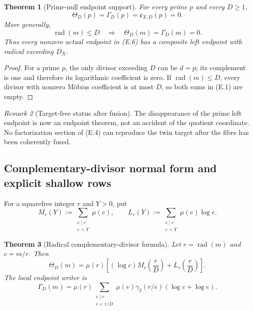 \documentclass[11pt]{article}
\newtheorem{theorem}{Theorem}[section]
\theoremstyle{definition}
\theoremstyle{remark}
\newtheorem{remark}[theorem]{Remark}
\newcommand{\rad}{\operatorname{rad}}
\begin{document}
\begin{theorem}[Prime-null endpoint support]
\label{thm:affend-prime-null}
For every prime $p$ and every $D\ge1$,
\begin{equation}
 \label{eq:affend-prime-null}
 \boxed{
 \Theta_D(p)=\Gamma_D(p)=\mathfrak e_{X,D}(p)=0.}
 \tag{E.7}
\end{equation}
More generally,
\begin{equation}
 \label{eq:affend-rad-support}
 \boxed{
 \rad(m)\le D
 \quad\Longrightarrow\quad
 \Theta_D(m)=\Gamma_D(m)=0.}
 \tag{E.8}
\end{equation}
Thus every nonzero actual endpoint in \textup{(E.6)} has a composite left
endpoint with radical exceeding $D_X$.
\end{theorem}

\begin{proof}
For a prime $p$, the only divisor exceeding $D$ can be $d=p$; its complement
is one and therefore its logarithmic coefficient is zero.  If
$\rad(m)\le D$, every divisor with nonzero M\"obius coefficient is at most
$D$, so both sums in \textup{(E.1)} are empty.
\end{proof}

\begin{remark}[Target-free status after fusion]
The disappearance of the prime left endpoint is now an endpoint theorem, not
an accident of the quotient coordinate.  No factorization section of
\textup{(E.4)} can reproduce the twin target after the fibre has been
coherently fused.
\end{remark}

\subsection{Complementary-divisor normal form and explicit shallow rows}
\label{subsec:affend-complementary-normal-form}

For a squarefree integer $r$ and $Y>0$, put
\[
 M_r(Y):=\sum_{\substack{e\mid r\\e<Y}}\mu(e),
 \qquad
 L_r(Y):=\sum_{\substack{e\mid r\\e<Y}}\mu(e)\log e.
\]

\begin{theorem}[Radical complementary-divisor formula]
\label{thm:affend-radical-formula}
Let $r=\rad(m)$ and $c=m/r$.  Then
\begin{equation}
 \label{eq:affend-radical-theta}
 \boxed{
 \Theta_D(m)
 =\mu(r)
 \left[
  (\log c)M_r\!\left(\frac rD\right)
  +L_r\!\left(\frac rD\right)
 \right].}
 \tag{E.9}
\end{equation}
The local endpoint writer is
\begin{equation}
 \label{eq:affend-radical-gamma}
 \boxed{
 \Gamma_D(m)
 =\mu(r)
 \sum_{\substack{e\mid r\\e<r/D}}
 \mu(e)\gamma_2(r/e)
 \left(\log c+\log e\right).}
 \tag{E.10}
\end{equation}
\end{theorem}
\end{document}
